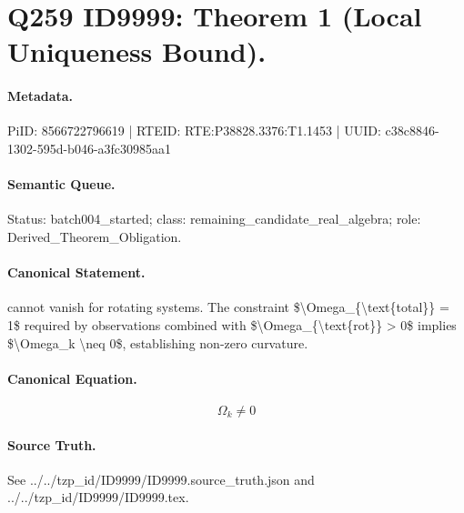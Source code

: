 \section*{Q259 ID9999: Theorem 1 (Local Uniqueness Bound).}
\paragraph{Metadata.}
PiID: 8566722796619 | RTEID: RTE:P38828.3376:T1.1453 | UUID: c38c8846-1302-595d-b046-a3fc30985aa1

\paragraph{Semantic Queue.}
Status: batch004\_started; class: remaining\_candidate\_real\_algebra; role: Derived\_Theorem\_Obligation.

\paragraph{Canonical Statement.}
cannot vanish for rotating systems. The constraint \$\textbackslash{}Omega\_\{\textbackslash{}text\{total\}\} = 1\$ required by observations combined with \$\textbackslash{}Omega\_\{\textbackslash{}text\{rot\}\} > 0\$ implies \$\textbackslash{}Omega\_k \textbackslash{}neq 0\$, establishing non-zero curvature.

\paragraph{Canonical Equation.}
\[
\Omega_k \neq 0
\]

\paragraph{Source Truth.}
See ../../tzp\_id/ID9999/ID9999.source\_truth.json and ../../tzp\_id/ID9999/ID9999.tex.
